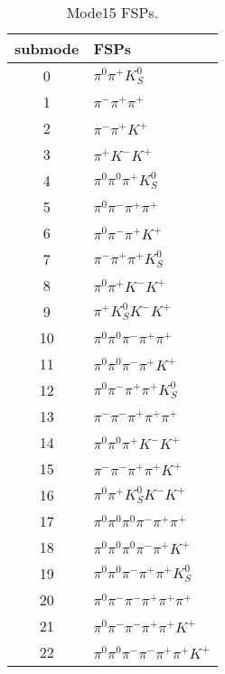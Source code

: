 \begin{table}[h!]
\begin{center}
\begin{tabular}{cl}
\hline
submode& FSPs\\
\hline
0 & $\pi^0 \pi^+ K_S^0 $ \\
1 & $\pi^- \pi^+ \pi^+ $ \\
2 & $\pi^- \pi^+ K^+ $ \\
3 & $\pi^+ K^- K^+ $ \\
4 & $\pi^0 \pi^0 \pi^+ K_S^0 $ \\
5 & $\pi^0 \pi^- \pi^+ \pi^+ $ \\
6 & $\pi^0 \pi^- \pi^+ K^+ $ \\
7 & $\pi^- \pi^+ \pi^+ K_S^0 $ \\
8 & $\pi^0 \pi^+ K^- K^+ $ \\
9 & $\pi^+ K_S^0 K^- K^+ $ \\
10 & $\pi^0 \pi^0 \pi^- \pi^+ \pi^+ $ \\
11 & $\pi^0 \pi^0 \pi^- \pi^+ K^+ $ \\
12 & $\pi^0 \pi^- \pi^+ \pi^+ K_S^0 $ \\
13 & $\pi^- \pi^- \pi^+ \pi^+ \pi^+ $ \\
14 & $\pi^0 \pi^0 \pi^+ K^- K^+ $ \\
15 & $\pi^- \pi^- \pi^+ \pi^+ K^+ $ \\
16 & $\pi^0 \pi^+ K_S^0 K^- K^+ $ \\
17 & $\pi^0 \pi^0 \pi^0 \pi^- \pi^+ \pi^+ $ \\
18 & $\pi^0 \pi^0 \pi^0 \pi^- \pi^+ K^+ $ \\
19 & $\pi^0 \pi^0 \pi^- \pi^+ \pi^+ K_S^0 $ \\
20 & $\pi^0 \pi^- \pi^- \pi^+ \pi^+ \pi^+ $ \\
21 & $\pi^0 \pi^- \pi^- \pi^+ \pi^+ K^+ $ \\
22 & $\pi^0 \pi^0 \pi^- \pi^- \pi^+ \pi^+ K^+ $ \\
\hline
\end{tabular}
\label{tab:Mode15FSPs}
\caption{Mode15 FSPs.}
\end{center}
\end{table}
